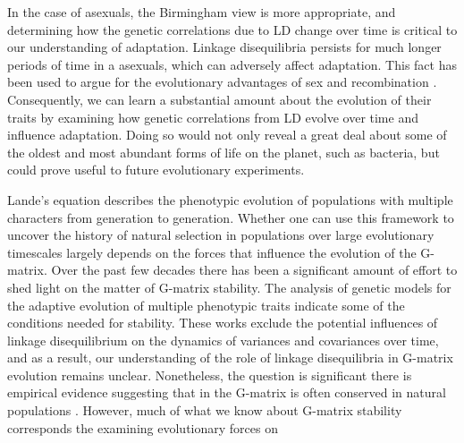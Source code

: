 \documentclass[11pt,twocolumn]{article}
\begin{document}
In the case of asexuals, the Birmingham view is more appropriate, and determining how the genetic correlations due to LD change over time is critical to our understanding of adaptation. Linkage disequilibria persists for much longer periods of time in a asexuals, which can adversely affect adaptation. This fact has been used to argue for the evolutionary advantages of sex and recombination \citep{Barton2005,Otto2009}. Consequently, we can learn a substantial amount about the evolution of their traits by examining how genetic correlations from LD evolve over time and influence adaptation. Doing so would not only reveal a great deal about some of the oldest and most abundant forms of life on the planet, such as bacteria, but could prove useful to future evolutionary experiments.\par

Lande’s equation describes the phenotypic evolution of populations with multiple characters from generation to generation.  Whether one can use this framework to uncover the history of natural selection in populations over large evolutionary timescales largely depends on the forces that influence the evolution of the G-matrix.  Over the past few decades there has been a significant amount of effort to shed light on the matter of G-matrix stability.  The analysis of genetic models for the adaptive evolution of multiple phenotypic traits indicate some of the conditions needed for stability\citep{Turelli1988,Jones2003}.  These works exclude the potential influences of linkage disequilibrium on the dynamics of variances and covariances over time, and as a result, our understanding of the role of linkage disequilibria in G-matrix evolution remains unclear.  Nonetheless, the question is significant there is empirical evidence suggesting that in the G-matrix is often conserved in natural populations \citep{Arnold1999,Roff2000,Steppan2002}.  However, much of what we know about G-matrix stability corresponds the examining evolutionary forces on 
\end{document}
